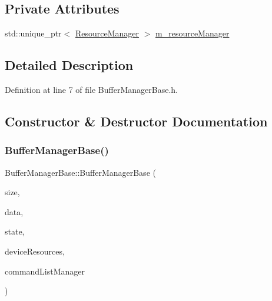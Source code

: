 \subsection*{Private Attributes}
\begin{DoxyCompactItemize}
\item 
std\+::unique\+\_\+ptr$<$ \mbox{\hyperlink{class_resource_manager}{Resource\+Manager}} $>$ \mbox{\hyperlink{class_buffer_manager_base_a1477064838478bbbf233da29598a2352}{m\+\_\+resource\+Manager}}
\end{DoxyCompactItemize}


\subsection{Detailed Description}


Definition at line 7 of file Buffer\+Manager\+Base.\+h.



\subsection{Constructor \& Destructor Documentation}
\mbox{\label{class_buffer_manager_base_a9cec2f80ae72dc972ef6d18ab075ab6c}} 
\subsubsection{\texorpdfstring{Buffer\+Manager\+Base()}{BufferManagerBase()}}
{\footnotesize\ttfamily Buffer\+Manager\+Base\+::\+Buffer\+Manager\+Base (\begin{DoxyParamCaption}\item[{U\+I\+NT}]{size,  }\item[{B\+Y\+TE $\ast$}]{data,  }\item[{D3\+D12\+\_\+\+R\+E\+S\+O\+U\+R\+C\+E\+\_\+\+S\+T\+A\+T\+ES}]{state,  }\item[{std\+::shared\+\_\+ptr$<$ \mbox{\hyperlink{class_d_x_1_1_device_resources}{D\+X\+::\+Device\+Resources}} $>$}]{device\+Resources,  }\item[{std\+::shared\+\_\+ptr$<$ \mbox{\hyperlink{class_command_list_manager}{Command\+List\+Manager}} $>$}]{command\+List\+Manager }\end{DoxyParamCaption})}



